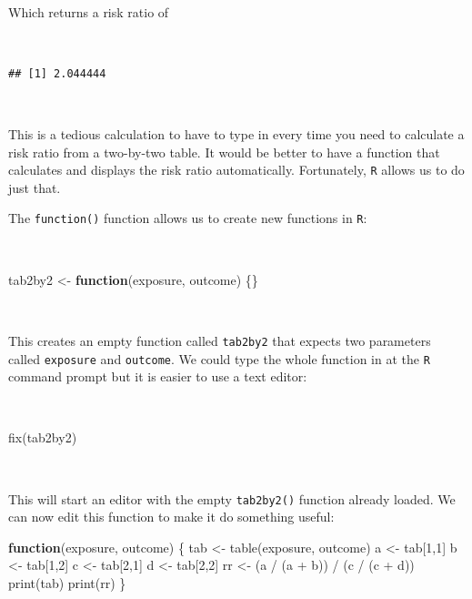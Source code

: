 \documentclass[
  12pt,
]{book}
\newenvironment{Shaded}{\begin{snugshade}}{\end{snugshade}}
\newcommand{\ControlFlowTok}[1]{\textcolor[rgb]{0.13,0.29,0.53}{\textbf{#1}}}
\newcommand{\DecValTok}[1]{\textcolor[rgb]{0.00,0.00,0.81}{#1}}
\newcommand{\FunctionTok}[1]{\textcolor[rgb]{0.00,0.00,0.00}{#1}}
\newcommand{\NormalTok}[1]{#1}
\newcommand{\OtherTok}[1]{\textcolor[rgb]{0.56,0.35,0.01}{#1}}
\newcommand{\SpecialCharTok}[1]{\textcolor[rgb]{0.00,0.00,0.00}{#1}}
\begin{document}
~

Which returns a risk ratio of

~

\begin{verbatim}
## [1] 2.044444
\end{verbatim}

~

This is a tedious calculation to have to type in every time you need to calculate a risk ratio from a two-by-two table. It would be better to have a function that calculates and displays the risk ratio automatically. Fortunately, \texttt{R} allows us to do just that.

The \texttt{function()} function allows us to create new functions in \texttt{R}:

~

\begin{Shaded}
\begin{Highlighting}[]
\NormalTok{tab2by2 }\OtherTok{\textless{}{-}} \ControlFlowTok{function}\NormalTok{(exposure, outcome) \{\}}
\end{Highlighting}
\end{Shaded}

~

This creates an empty function called \texttt{tab2by2} that expects two parameters called \texttt{exposure} and \texttt{outcome}. We could type the whole function in at the \texttt{R} command prompt but it is easier to use a text editor:

~

\begin{Shaded}
\begin{Highlighting}[]
\FunctionTok{fix}\NormalTok{(tab2by2)}
\end{Highlighting}
\end{Shaded}

~

This will start an editor with the empty \texttt{tab2by2()} function already loaded. We can now edit this function to make it do something useful:

\newpage

\begin{Shaded}
\begin{Highlighting}[]
\ControlFlowTok{function}\NormalTok{(exposure, outcome)}
\NormalTok{  \{}
\NormalTok{  tab }\OtherTok{\textless{}{-}} \FunctionTok{table}\NormalTok{(exposure, outcome)}
\NormalTok{  a }\OtherTok{\textless{}{-}}\NormalTok{ tab[}\DecValTok{1}\NormalTok{,}\DecValTok{1}\NormalTok{]}
\NormalTok{  b }\OtherTok{\textless{}{-}}\NormalTok{ tab[}\DecValTok{1}\NormalTok{,}\DecValTok{2}\NormalTok{]}
\NormalTok{  c }\OtherTok{\textless{}{-}}\NormalTok{ tab[}\DecValTok{2}\NormalTok{,}\DecValTok{1}\NormalTok{]}
\NormalTok{  d }\OtherTok{\textless{}{-}}\NormalTok{ tab[}\DecValTok{2}\NormalTok{,}\DecValTok{2}\NormalTok{]}
\NormalTok{  rr }\OtherTok{\textless{}{-}}\NormalTok{ (a }\SpecialCharTok{/}\NormalTok{ (a }\SpecialCharTok{+}\NormalTok{ b)) }\SpecialCharTok{/}\NormalTok{ (c }\SpecialCharTok{/}\NormalTok{ (c }\SpecialCharTok{+}\NormalTok{ d))}
  \FunctionTok{print}\NormalTok{(tab)}
  \FunctionTok{print}\NormalTok{(rr) }
\NormalTok{  \}}
\end{Highlighting}
\end{Shaded}
\end{document}
